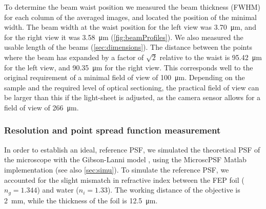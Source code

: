     To determine the beam waist position we measured the beam thickness (FWHM) for each column of the averaged images, and located the position of the minimal width. The beam width at the waist position for the left view was   \SI{3.70}{\micro m}, and for the right view it was \SI{3.58}{\micro m} (\autoref{fig:beamProfiles}). We also measured the usable length of the beams (\autoref{sec:dimensions}). The distance between the points where the beam has expanded by a factor of $\sqrt2$ relative to the waist is \SI{95.42}{\micro m} for the left view, and \SI{90.35}{\micro m} for the right view. This corresponds well to the original requirement of a minimal field of view of \SI{100}{\micro m}. Depending on the sample and the required level of optical sectioning, the practical field of view can be larger than this if the light-sheet is adjusted, as the camera sensor allows for a field of view of \SI{266}{\micro m}.  

    


  


  \subsubsection{Resolution and point spread function measurement}

    In order to establish an ideal, reference PSF, we simulated the theoretical PSF of the microscope with the Gibson-Lanni model \cite{gibson_experimental_1992}, using the MicroscPSF Matlab implementation \cite{li_fast_2017} (see also \autoref{sec:simu}). To simulate the reference PSF, we accounted for the slight mismatch in refractive index between the FEP foil ($n_g = 1.344$) and water ($n_i = 1.33$). The working distance of the objective is \SI{2}{mm}, while the thickness of the foil is \SI{12.5}{\micro m}. 


